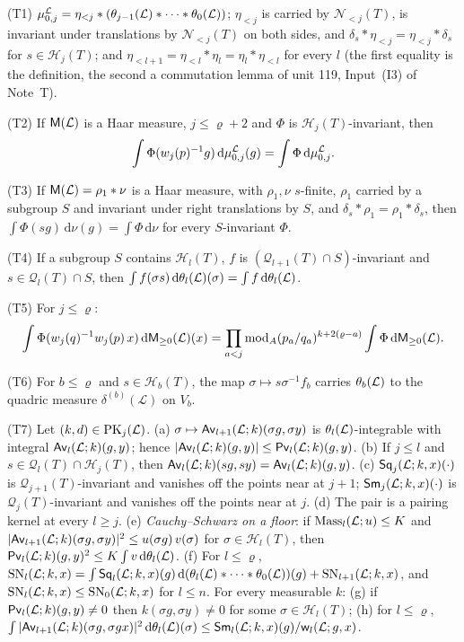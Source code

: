 \documentclass[11pt,a4paper]{article}
\newcommand{\m}[1]{\mbox{$#1$}}        %
\theoremstyle{plainx}
\theoremstyle{uprightx}
\newcommand{\cL}{\mathcal{L}}
\newcommand{\dd}{\mathrm{d}}
\newcommand{\Hl}[2]{\mathcal{H}_{#1}(#2)}
\newcommand{\Ql}[2]{\mathcal{Q}_{#1}(#2)}
\newcommand{\Nb}[2]{\mathcal{N}_{<#1}(#2)}
\newcommand{\modA}{\operatorname{mod}_A}
\newcommand{\wl}[2]{w_{#1}(#2)}
\newcommand{\etab}[1]{\eta_{<#1}}
\newcommand{\quadric}[2]{\delta^{(#2)}(#1)}
\newcommand{\Inp}[1]{\textup{(#1)}}
\begin{document}
\Inp{T1} $\stackMeasure{\cL}_{0,j}=\etab{j}*(\floorMeasure{\cL}{j-1}*\dots*\floorMeasure{\cL}{0})$; $\etab{j}$ is
carried by $\Nb{j}{T}$, is invariant under translations by $\Nb{j}{T}$ on both sides, and
$\delta_s*\etab{j}=\etab{j}*\delta_s$ for $s\in\Hl{j}{T}$; and $\etab{l+1}=\etab{l}*\eta_l=\eta_l*\etab{l}$ for
every $l$ (the first equality is the definition, the second a commutation lemma of unit 119, Input~(I3) of Note~T).

\Inp{T2} If $\groupMeasure{\cL}$ is a Haar measure, $j\le\varrho+2$ and $\Phi$ is $\Hl{j}{T}$-invariant, then
\[\int\Phi(\wl{j}{p}^{-1}g)\,\dd\stackMeasure{\cL}_{0,j}(g)=\int\Phi\,\dd\stackMeasure{\cL}_{0,j}.\]

\Inp{T3} If $\groupMeasure{\cL}=\rho_1*\nu$ is a Haar measure, with $\rho_1,\nu$ $s$-finite, $\rho_1$ carried by a
subgroup $S$ and invariant under right translations by $S$, and $\delta_s*\rho_1=\rho_1*\delta_s$, then
$\int\Phi(sg)\,\dd\nu(g)=\int\Phi\,\dd\nu$ for every $S$-invariant $\Phi$.

\Inp{T4} If a subgroup $S$ contains $\Hl{l}{T}$, $f$ is $(\Ql{l+1}{T}\cap S)$-invariant and $s\in\Ql{l}{T}\cap S$,
then $\int f(\sigma s)\,\dd\floorMeasure{\cL}{l}(\sigma)=\int f\,\dd\floorMeasure{\cL}{l}$.

\Inp{T5} For $j\le\varrho$:
\[\int\Phi(\weylRatio{j}{p}{q}\,x)\,\dd\upperMeasure{\cL}{0}(x)=\prod_{a<j}\modA(p_a/q_a)^{k+2(\varrho-a)}\int\Phi\,\dd\upperMeasure{\cL}{0}.\]

\Inp{T6} For $b\le\varrho$ and $s\in\Hl{b}{T}$, the map $\sigma\mapsto s\sigma^{-1}f_b$ carries
$\floorMeasure{\cL}{b}$ to the quadric measure $\quadric{\cL}{b}$ on $V_b$.

\Inp{T7} Let \m{\IsPairingKernel{\cL}{j}{k}{d}}. (a) $\sigma\mapsto\upperPairing{\cL}{l+1}{k}{\sigma g}{\sigma y}$ is
$\floorMeasure{\cL}{l}$-integrable with integral $\upperPairing{\cL}{l}{k}{g}{y}$; hence
$|\upperPairing{\cL}{l}{k}{g}{y}|\le\pivotModulus{\cL}{l}{k}{g}{y}$. (b) If $j\le l$ and
$s\in\Ql{l}{T}\cap\Hl{j}{T}$, then $\upperPairing{\cL}{l}{k}{sg}{sy}=\upperPairing{\cL}{l}{k}{g}{y}$. (c)
$\weightedSquare{\cL}{j}{k}{x}{\cdot}$ is $\Ql{j+1}{T}$-invariant and vanishes off the points near at $j+1$;
$\weightedSquareSum{\cL}{k}{x}{j}{\cdot}$ is $\Ql{j}{T}$-invariant and vanishes off the points near at $j$. (d) The
pair is a pairing kernel at every $l\ge j$. (e) \emph{Cauchy--Schwarz on a floor}: if \m{\FloorMassLe{\cL}{l}{K}{u}}
and $|\upperPairing{\cL}{l+1}{k}{\sigma g}{\sigma y}|^{2}\le u(\sigma g)\,v(\sigma)$ for $\sigma\in\Hl{l}{T}$, then
$\pivotModulus{\cL}{l}{k}{g}{y}^{2}\le K\int v\,\dd\floorMeasure{\cL}{l}$. (f) For $l\le\varrho$,
$\selfNorm{\cL}{l}{k}{x}=\int\weightedSquare{\cL}{l}{k}{x}{g}\,\dd(\floorMeasure{\cL}{l}*\dots*\floorMeasure{\cL}{0})(g)+\selfNorm{\cL}{l+1}{k}{x}$,
and $\selfNorm{\cL}{l}{k}{x}\le\selfNorm{\cL}{0}{k}{x}$ for $l\le n$. For every measurable $k$: (g) if
$\pivotModulus{\cL}{l}{k}{g}{y}\ne0$ then $k(\sigma g,\sigma y)\ne0$ for some $\sigma\in\Hl{l}{T}$; (h) for
$l\le\varrho$, $\int|\upperPairing{\cL}{l+1}{k}{\sigma g}{\sigma gx}|^{2}\,\dd\floorMeasure{\cL}{l}(\sigma)\le
\weightedSquareSum{\cL}{k}{x}{l}{g}/\floorWeight{\cL}{l}{g}{x}$.
\end{document}
